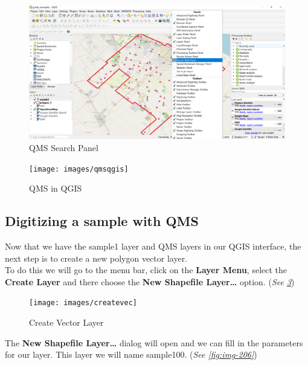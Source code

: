 \documentclass[
]{book}
\begin{document}
\begin{figure}

{\centering \includegraphics[width=1\linewidth]{images/qmspanel} 

}

\caption{QMS Search Panel}\label{fig:img-203}
\end{figure}
\begin{figure}

{\centering \texttt{[image: images/qmsqgis]} 

}

\caption{QMS in QGIS}\label{fig:img-204}
\end{figure}

\hypertarget{digitizing-a-sample-with-qms}{%
\subsection{Digitizing a sample with QMS}\label{digitizing-a-sample-with-qms}}

Now that we have the {sample1} layer and QMS layers in our QGIS interface, the next step is to create a new polygon vector layer.\\
To do this we will go to the menu bar, click on the \textbf{Layer Menu}, select the \textbf{Create Layer} and there choose the \textbf{New Shapefile Layer\ldots{}} option. (\emph{See \ref{fig:img-205}})

\begin{figure}

{\centering \texttt{[image: images/createvec]} 

}

\caption{Create Vector Layer}\label{fig:img-205}
\end{figure}

The \textbf{New Shapefile Layer\ldots{}} dialog will open and we can fill in the parameters for our layer. This layer we will name {sample100}. (\emph{See \ref{fig:img-206}})
\end{document}
